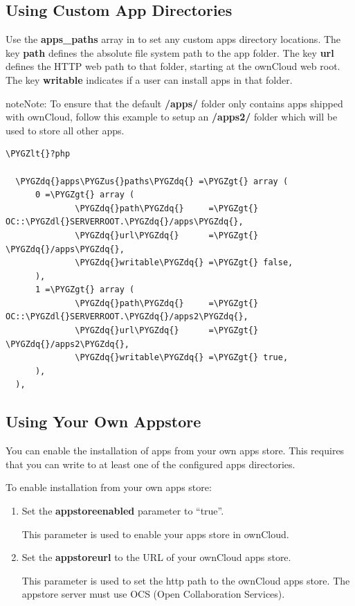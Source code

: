 \documentclass[letterpaper,10pt,english]{sphinxmanual}
\def\PYGZus{\char`\_}
\def\PYGZlt{\char`\<}
\def\PYGZgt{\char`\>}
\def\PYGZdl{\char`\$}
\def\PYGZdq{\char`\"}
\begin{document}
\subsection{Using Custom App Directories}
\label{installation/apps_management_installation:using-custom-app-directories}
Use the \textbf{apps\_paths} array in  to set any custom apps directory
locations. The key \textbf{path} defines the absolute file system path to the app
folder. The key \textbf{url} defines the HTTP web path to that folder, starting at
the ownCloud web root. The key \textbf{writable} indicates if a user can install apps
in that folder.

\begin{notice}{note}{Note:}
To ensure that the default \textbf{/apps/} folder only contains apps
shipped with ownCloud, follow this example to setup an \textbf{/apps2/} folder
which will be used to store all other apps.
\end{notice}

\begin{Verbatim}[commandchars=\\\{\}]
\PYGZlt{}?php

  \PYGZdq{}apps\PYGZus{}paths\PYGZdq{} =\PYGZgt{} array (
      0 =\PYGZgt{} array (
              \PYGZdq{}path\PYGZdq{}     =\PYGZgt{} OC::\PYGZdl{}SERVERROOT.\PYGZdq{}/apps\PYGZdq{},
              \PYGZdq{}url\PYGZdq{}      =\PYGZgt{} \PYGZdq{}/apps\PYGZdq{},
              \PYGZdq{}writable\PYGZdq{} =\PYGZgt{} false,
      ),
      1 =\PYGZgt{} array (
              \PYGZdq{}path\PYGZdq{}     =\PYGZgt{} OC::\PYGZdl{}SERVERROOT.\PYGZdq{}/apps2\PYGZdq{},
              \PYGZdq{}url\PYGZdq{}      =\PYGZgt{} \PYGZdq{}/apps2\PYGZdq{},
              \PYGZdq{}writable\PYGZdq{} =\PYGZgt{} true,
      ),
  ),
\end{Verbatim}


\subsection{Using Your Own Appstore}
\label{installation/apps_management_installation:using-your-own-appstore}
You can enable the installation of apps from your own apps store. This requires that you
can write to at least one of the configured apps directories.

To enable installation from your own apps store:
\begin{enumerate}
\item {} 
Set the \textbf{appstoreenabled} parameter to ``true''.

This parameter is used to enable your apps store in ownCloud.

\item {} 
Set the \textbf{appstoreurl} to the URL of your ownCloud apps store.

This parameter is used to set the http path to the ownCloud apps store. The appstore
server must use \textsc{OCS} (Open Collaboration Services).

\end{enumerate}
\end{document}
